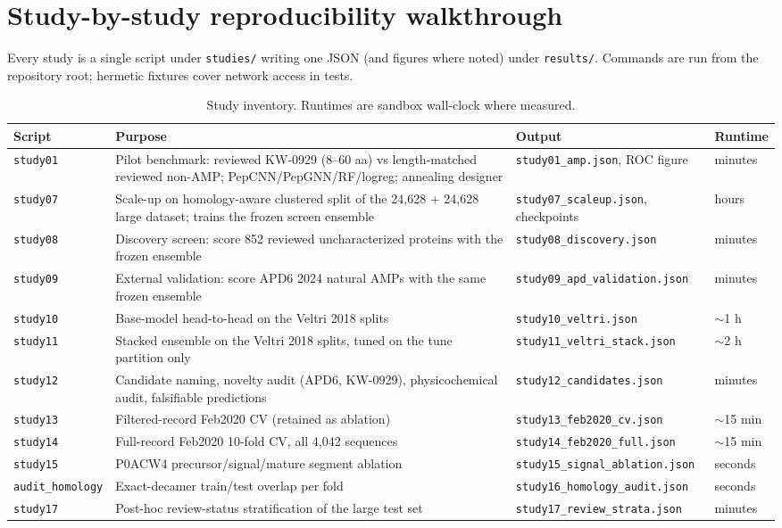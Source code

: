 
\section{Study-by-study reproducibility walkthrough}\label{app:studies}
Every study is a single script under \texttt{studies/} writing one JSON
(and figures where noted) under \texttt{results/}. Commands are run from
the repository root; hermetic fixtures cover network access in tests.

\begin{table}[h]\centering\scriptsize
\caption{Study inventory. Runtimes are sandbox wall-clock where measured.}
\label{tab:studies}
\begin{tabular}{p{1.3cm}p{6.2cm}p{4.6cm}p{1.8cm}}
\hline
Script & Purpose & Output & Runtime \\
\hline
\texttt{study01} & Pilot benchmark: reviewed KW-0929 (8--60 aa) vs
length-matched reviewed non-AMP; PepCNN/PepGNN/RF/logreg; annealing
designer & \texttt{study01\_amp.json}, ROC figure & minutes \\
\texttt{study07} & Scale-up on homology-aware clustered split of the
24{,}628 + 24{,}628 large dataset; trains the frozen screen ensemble &
\texttt{study07\_scaleup.json}, checkpoints & hours \\
\texttt{study08} & Discovery screen: score 852 reviewed uncharacterized
proteins with the frozen ensemble & \texttt{study08\_discovery.json} & minutes \\
\texttt{study09} & External validation: score APD6 2024 natural AMPs with
the same frozen ensemble & \texttt{study09\_apd\_validation.json} & minutes \\
\texttt{study10} & Base-model head-to-head on the Veltri 2018 splits &
\texttt{study10\_veltri.json} & $\sim$1 h \\
\texttt{study11} & Stacked ensemble on the Veltri 2018 splits, tuned on
the tune partition only & \texttt{study11\_veltri\_stack.json} & $\sim$2 h \\
\texttt{study12} & Candidate naming, novelty audit (APD6, KW-0929),
physicochemical audit, falsifiable predictions &
\texttt{study12\_candidates.json} & minutes \\
\texttt{study13} & Filtered-record Feb2020 CV (retained as ablation) &
\texttt{study13\_feb2020\_cv.json} & $\sim$15 min \\
\texttt{study14} & Full-record Feb2020 10-fold CV, all 4{,}042 sequences &
\texttt{study14\_feb2020\_full.json} & $\sim$15 min \\
\texttt{study15} & P0ACW4 precursor/signal/mature segment ablation &
\texttt{study15\_signal\_ablation.json} & seconds \\
\texttt{audit\_homology} & Exact-decamer train/test overlap per fold &
\texttt{study16\_homology\_audit.json} & seconds \\
\texttt{study17} & Post-hoc review-status stratification of the large
test set & \texttt{study17\_review\_strata.json} & minutes \\
\hline
\end{tabular}
\end{table}

